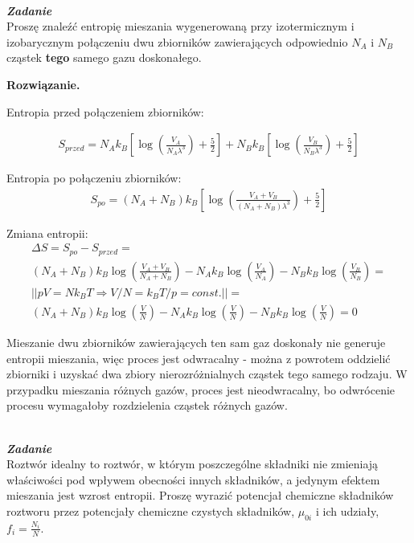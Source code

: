 \documentclass[11pt,a4paper]{article}
\newcounter{zadanie}\newcommand{\zadanie}[1][]{\addtocounter{zadanie}{1} ~\\ {\bf \emph{Zadanie \arabic{zadanie} #1 }} \\}
\newenvironment{solution}{\vspace{1cm} \par\textbf{Rozwiązanie.} \vspace{1cm}}{}
\begin{document}
\zadanie[]

Proszę znaleźć entropię mieszania wygenerowaną przy izotermicznym i izobarycznym 
połączeniu dwu zbiorników zawierających odpowiednio $N_A$ i $N_B$ cząstek {\bf tego} 
samego gazu doskonałego.

\begin{solution}
  
Entropia przed połączeniem zbiorników:

\begin{align*}
  S_{przed} =
  N_Ak_B \left[ \log\left( \frac{V_{A}}{N_A\lambda^3} \right) + \frac{5}{2} \right] +
  N_Bk_B \left[ \log\left( \frac{V_{B}}{N_B\lambda^3} \right) + \frac{5}{2} \right] 
\end{align*}

Entropia po połączeniu zbiorników:
\begin{align*}
  S_{po} =
  (N_A+N_B)k_B \left[ \log\left( \frac{V_A+V_B}{(N_A+N_B)\lambda^3} \right) + \frac{5}{2} \right]
\end{align*}

Zmiana entropii:
\begin{align*}
  \Delta S = S_{po} - S_{przed} = \\
  (N_A+N_B)k_B \log\left( \frac{V_A+V_B}{N_A + N_B} \right) -
  N_Ak_B \log\left( \frac{V_A}{N_A} \right) -
  N_Bk_B \log\left( \frac{V_B}{N_B} \right) = \\
  || pV = Nk_BT \Rightarrow V/N = k_BT/p = const. || = \\
  (N_A+N_B)k_B \log\left( \frac{V}{N} \right) -
  N_Ak_B \log\left( \frac{V}{N} \right) -
  N_Bk_B \log\left( \frac{V}{N} \right) = 0
\end{align*}

Mieszanie dwu zbiorników zawierających ten sam gaz doskonały nie generuje entropii mieszania,
więc proces jest odwracalny - można z powrotem oddzielić zbiorniki i uzyskać dwa zbiory 
nierozróżnialnych cząstek tego samego rodzaju. W przypadku mieszania różnych gazów, 
proces jest nieodwracalny, bo odwrócenie procesu wymagałoby rozdzielenia cząstek różnych gazów.

\newpage

\end{solution}
\zadanie[]

Roztwór idealny to roztwór, w którym poszczególne składniki nie 
zmieniają właściwości pod wpływem obecności innych składników, 
a jedynym efektem mieszania jest wzrost entropii. Proszę wyrazić 
potencjał chemiczne składników roztworu przez potencjały chemiczne 
czystych składników, $\mu_{0i}$ i ich udziały, $f_i = \frac{N_i}{N}$.
\end{document}
